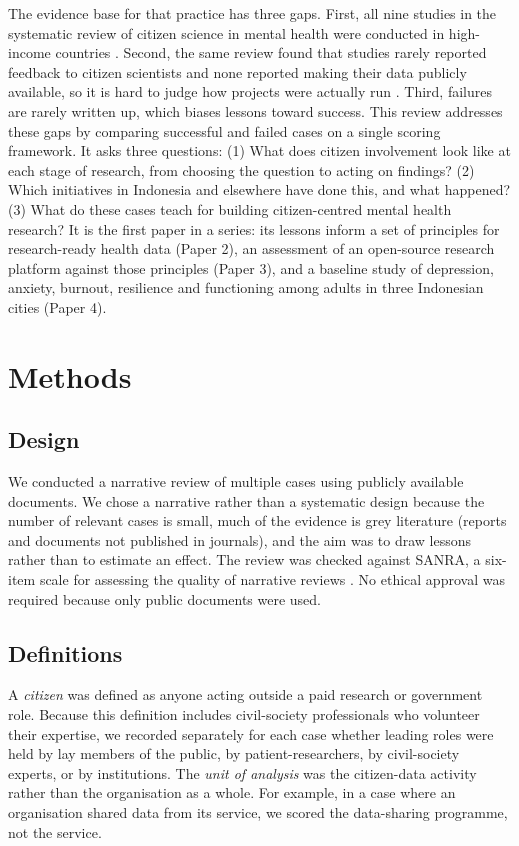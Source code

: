 \documentclass[
  number,
  preprint]{elsarticle}
\newcounter{none} %
\begin{document}
The evidence base for that practice has three gaps. First, all nine
studies in the systematic review of citizen science in mental health
were conducted in high-income countries \citep{todowede2023}. Second,
the same review found that studies rarely reported feedback to citizen
scientists and none reported making their data publicly available, so it
is hard to judge how projects were actually run \citep{todowede2023}.
Third, failures are rarely written up, which biases lessons toward
success. This review addresses these gaps by comparing successful and
failed cases on a single scoring framework. It asks three questions: (1)
What does citizen involvement look like at each stage of research, from
choosing the question to acting on findings? (2) Which initiatives in
Indonesia and elsewhere have done this, and what happened? (3) What do
these cases teach for building citizen-centred mental health research?
It is the first paper in a series: its lessons inform a set of
principles for research-ready health data (Paper 2), an assessment of an
open-source research platform against those principles (Paper 3), and a
baseline study of depression, anxiety, burnout, resilience and
functioning among adults in three Indonesian cities (Paper 4).

\section{Methods}\label{sec-methods}

\subsection{Design}\label{design}

We conducted a narrative review of multiple cases using publicly
available documents. We chose a narrative rather than a systematic
design because the number of relevant cases is small, much of the
evidence is grey literature (reports and documents not published in
journals), and the aim was to draw lessons rather than to estimate an
effect. The review was checked against SANRA, a six-item scale for
assessing the quality of narrative reviews \citep{baethge2019}. No
ethical approval was required because only public documents were used.

\subsection{Definitions}\label{definitions}

A \emph{citizen} was defined as anyone acting outside a paid research or
government role. Because this definition includes civil-society
professionals who volunteer their expertise, we recorded separately for
each case whether leading roles were held by lay members of the public,
by patient-researchers, by civil-society experts, or by institutions.
The \emph{unit of analysis} was the citizen-data activity rather than
the organisation as a whole. For example, in a case where an
organisation shared data from its service, we scored the data-sharing
programme, not the service.
\end{document}
